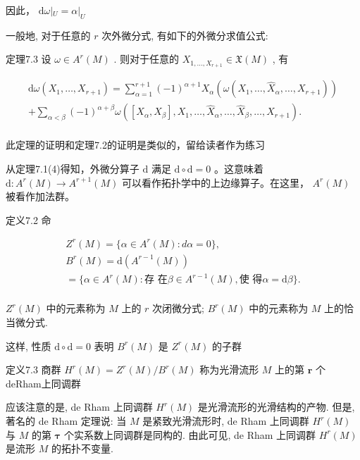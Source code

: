 因此，  $\mathrm{d}\omega |_{U} = \alpha |_{U}$

一般地, 对于任意的  $r$  次外微分式, 有如下的外微分求值公式:

定理7.3 设  $\omega \in A^{r}(M)$ . 则对于任意的  $X_{1, \dots, X_{r+1}} \in \mathfrak{X}(M)$ , 有

$$
\begin{array}{l} \mathrm {d} \omega \left(X _ {1}, \dots , X _ {r + 1}\right) = \sum_ {\alpha = 1} ^ {r + 1} (- 1) ^ {\alpha + 1} X _ {\alpha} \left(\omega \left(X _ {1}, \dots , \hat {X} _ {\alpha}, \dots , X _ {r + 1}\right)\right) \\ + \sum_ {\alpha <   \beta} (- 1) ^ {\alpha + \beta} \omega ([ X _ {\alpha}, X _ {\beta} ], X _ {1}, \dots , \hat {X} _ {\alpha}, \dots , \hat {X} _ {\beta}, \dots , X _ {r + 1}). \\ \end{array}
$$

此定理的证明和定理7.2的证明是类似的，留给读者作为练习

从定理7.1(4)得知，外微分算子  $\mathrm{d}$  满足  $\mathrm{d} \circ \mathrm{d} = 0$ 。这意味着  $\mathrm{d}: A^r(M) \to A^{r+1}(M)$  可以看作拓扑学中的上边缘算子。在这里， $A^r(M)$  被看作加法群。

定义7.2 命

$$
\begin{array}{l} Z ^ {r} (M) = \{\alpha \in A ^ {r} (M): d \alpha = 0 \}, \\ B ^ {r} (M) = \mathrm {d} \left(A ^ {r - 1} (M)\right) \\ = \{\alpha \in A ^ {r} (M): \text {存 在} \beta \in A ^ {r - 1} (M), \text {使 得} \alpha = \mathrm {d} \beta \}. \\ \end{array}
$$

$Z^{r}(M)$  中的元素称为  $M$  上的  $r$  次闭微分式;  $B^{r}(M)$  中的元素称为  $M$  上的恰当微分式.

这样, 性质  $\mathrm{d} \circ \mathrm{d} = 0$  表明  $B^{r}(M)$  是  $Z^{r}(M)$  的子群

定义7.3 商群  $H^{r}(M) = Z^{r}(M) / B^{r}(M)$  称为光滑流形  $M$  上的第  $\pmb{r}$  个deRham上同调群

应该注意的是, de Rham 上同调群  $H^{r}(M)$  是光滑流形的光滑结构的产物. 但是, 著名的 de Rham 定理说: 当  $M$  是紧致光滑流形时, de Rham 上同调群  $H^{r}(M)$  与  $M$  的第  $\pmb{\tau}$  个实系数上同调群是同构的. 由此可见, de Rham 上同调群  $H^{r}(M)$  是流形  $M$  的拓扑不变量.

